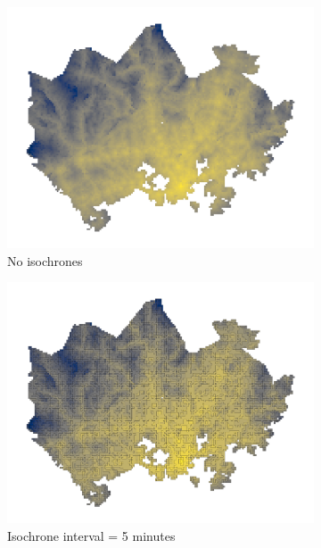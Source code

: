 \begin{figure}[H]
	\centering
	\begin{subfigure}[b]{0.5\textwidth}
		\includegraphics[width=\textwidth]{visual/figures/ttm/isochrone_interval_1}
		\caption{No isochrones}
		\label{fig:interval 1}
	\end{subfigure}%
	\hfill
	\begin{subfigure}[b]{0.5\textwidth}
		\includegraphics[width=\textwidth]{visual/figures/ttm/isochrone_interval_5}
		\caption{Isochrone interval = 5 minutes}
		\label{fig:interval 10}
	\end{subfigure}%
	\hfill
	\begin{subfigure}[b]{0.5\textwidth}

\end{subfigure}
\end{figure}
